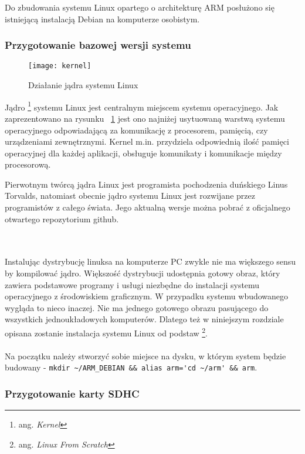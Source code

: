 Do zbudowania systemu Linux opartego o architekturę ARM posłużono się istniejącą instalacją Debian na komputerze osobistym. 

\subsubsection{Przygotowanie bazowej wersji systemu}

\begin{figure}
\begin{center}
    \texttt{[image: kernel]}
\end{center}
\caption{Działanie jądra systemu Linux}
\label{fig:kernel}
\end{figure}

Jądro \footnote{ang. \emph{Kernel}} systemu Linux jest centralnym miejscem systemu operacyjnego. Jak zaprezentowano na rysunku ~\ref{fig:kernel} jest ono najniżej usytuowaną warstwą systemu operacyjnego odpowiadającą za komunikację z procesorem, pamięcią, czy urządzeniami zewnętrznymi. Kernel m.in. przydziela odpowiednią ilość pamięci operacyjnej dla każdej aplikacji, obsługuje komunikaty i komunikacje między procesorową.

Pierwotnym twórcą jądra Linux jest programista pochodzenia duńskiego Linus Torvalds, natomiast obecnie jądro systemu Linux jest rozwijane przez programistów z całego świata. Jego aktualną wersje można pobrać z oficjalnego otwartego repozytorium github.

\\
\\


Instalując dystrybucję linuksa na komputerze PC zwykle nie ma większego sensu by kompilować jądro. Większość dystrybucji udostępnia gotowy obraz, który zawiera podstawowe programy i usługi niezbędne do instalacji systemu operacyjnego z środowiskiem graficznym. W przypadku systemu wbudowanego wygląda to nieco inaczej. Nie ma jednego gotowego obrazu pasującego do wszystkich jednoukładowych komputerów. Dlatego też w niniejszym rozdziale opisana zostanie instalacja systemu Linux od podstaw \footnote{ang. \emph{Linux From Scratch}}.
\\
\\

Na początku należy stworzyć sobie miejsce na dysku, w którym system będzie budowany - \lstinline|mkdir ~/ARM_DEBIAN && alias arm='cd ~/arm' && arm|.

\subsubsection{Przygotowanie karty SDHC}


